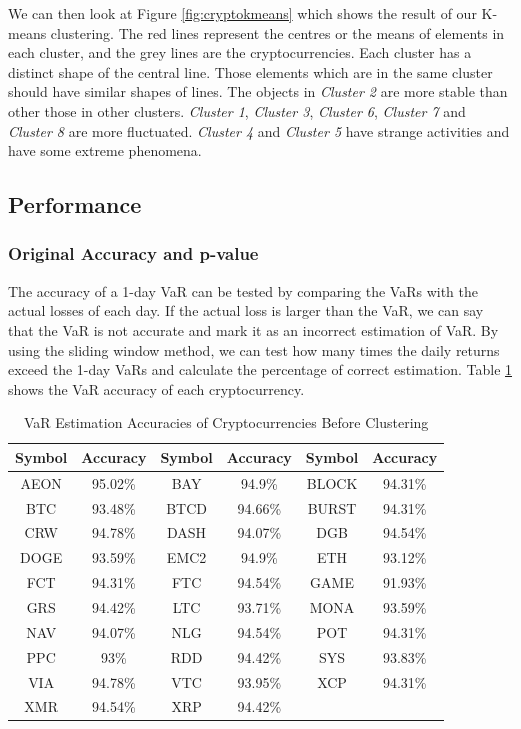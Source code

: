 \documentclass[11pt]{article} %
\theoremstyle{plain}
\theoremstyle{definition}
\begin{document}
We can then look at Figure \ref{fig:cryptokmeans} which shows the result of our K-means clustering. The red lines represent the centres or the means of elements in each cluster, and the grey lines are the cryptocurrencies. Each cluster has a distinct shape of the central line. Those elements which are in the same cluster should have similar shapes of lines. The objects in \textsl{Cluster 2} are more stable than other those in other clusters. \textsl{Cluster 1}, \textsl{Cluster 3}, \textsl{Cluster 6}, \textsl{Cluster 7} and \textsl{Cluster 8} are more fluctuated. \textsl{Cluster 4} and \textsl{Cluster 5} have strange activities and have some extreme phenomena.

\subsection{Performance}

\subsubsection{Original Accuracy and p-value}

The accuracy of a 1-day VaR can be tested by comparing the VaRs with the actual losses of each day. If the actual loss is larger than the VaR, we can say that the VaR is not accurate and mark it as an incorrect estimation of VaR. By using the sliding window method, we can test how many times the daily returns exceed the 1-day VaRs and calculate the percentage of correct estimation. Table \ref{table:acccryptobefore} shows the VaR accuracy of each cryptocurrency.

{
  \begin{table}[ht]
    \centering
    \small
    \begin{tabular}{|c|c|c|c|c|c|}
        \hline
        Symbol & Accuracy & Symbol & Accuracy & Symbol & Accuracy \\
        \hline
        AEON & 95.02\% & BAY & 94.9\% & BLOCK & 94.31\% \\
        BTC & 93.48\% & BTCD & 94.66\% & BURST & 94.31\% \\
        CRW & 94.78\% & DASH & 94.07\% & DGB & 94.54\% \\
        DOGE & 93.59\% & EMC2 & 94.9\% & ETH & 93.12\% \\
        FCT & 94.31\% & FTC & 94.54\% & GAME & 91.93\% \\
        GRS & 94.42\% & LTC & 93.71\% & MONA & 93.59\% \\
        NAV & 94.07\% & NLG & 94.54\% & POT & 94.31\% \\
        PPC & 93\% & RDD & 94.42\% & SYS & 93.83\% \\
        VIA & 94.78\% & VTC & 93.95\% & XCP & 94.31\% \\
        XMR & 94.54\% & XRP & 94.42\% & & \\
        \hline
    \end{tabular}
    \caption{VaR Estimation Accuracies of Cryptocurrencies Before Clustering}
    \label{table:acccryptobefore}
  \end{table}
}
\end{document}
